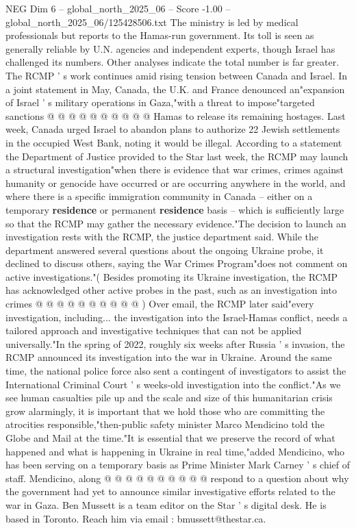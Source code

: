 \begin{textsample}{NEG Dim 6 – global\_north\_2025\_06 – Score -1.00 – global\_north\_2025\_06/125428506.txt}
The ministry is led by medical professionals but reports to the Hamas-run government.
Its toll is seen as generally reliable by U.N. agencies and independent experts, though Israel has challenged its numbers.
Other analyses indicate the total number is far greater.
The RCMP ' s work continues amid rising tension between Canada and Israel.
In a joint statement in May, Canada, the U.K. and France denounced an"expansion of Israel ' s military operations in Gaza,"with a threat to impose"targeted sanctions @ @ @ @ @ @ @ @ @ @ Hamas to release its remaining hostages.
Last week, Canada urged Israel to abandon plans to authorize 22 Jewish settlements in the occupied West Bank, noting it would be illegal.
According to a statement the Department of Justice provided to the Star last week, the RCMP may launch a structural investigation"when there is evidence that war crimes, crimes against humanity or genocide have occurred or are occurring anywhere in the world, and where there is a specific immigration community in Canada -- either on a temporary \textbf{residence} or permanent \textbf{residence} basis -- which is sufficiently large so that the RCMP may gather the necessary evidence."The decision to launch an investigation rests with the RCMP, the justice department said.
While the department answered several questions about the ongoing Ukraine probe, it declined to discuss others, saying the War Crimes Program"does not comment on active investigations."( Besides promoting its Ukraine investigation, the RCMP has acknowledged other active probes in the past, such as an investigation into crimes @ @ @ @ @ @ @ @ @ @ ) Over email, the RCMP later said"every investigation, including... the investigation into the Israel-Hamas conflict, needs a tailored approach and investigative techniques that can not be applied universally."In the spring of 2022, roughly six weeks after Russia ' s invasion, the RCMP announced its investigation into the war in Ukraine.
Around the same time, the national police force also sent a contingent of investigators to assist the International Criminal Court ' s weeks-old investigation into the conflict."As we see human casualties pile up and the scale and size of this humanitarian crisis grow alarmingly, it is important that we hold those who are committing the atrocities responsible,"then-public safety minister Marco Mendicino told the Globe and Mail at the time."It is essential that we preserve the record of what happened and what is happening in Ukraine in real time,"added Mendicino, who has been serving on a temporary basis as Prime Minister Mark Carney ' s chief of staff.
Mendicino, along @ @ @ @ @ @ @ @ @ @ respond to a question about why the government had yet to announce similar investigative efforts related to the war in Gaza.
Ben Mussett is a team editor on the Star ' s digital desk.
He is based in Toronto.
Reach him via email : bmussett@thestar.ca.

\end{textsample}
